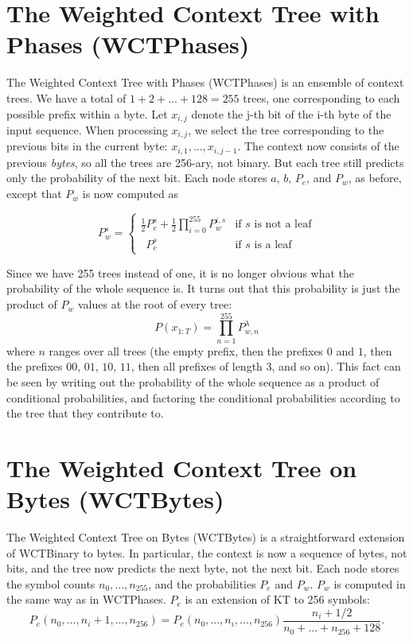 \documentclass[11pt]{scrartcl}
\begin{document}
\section{The Weighted Context Tree with Phases (WCTPhases)}
\label{sec:wct-phases}

The Weighted Context Tree with Phases (WCTPhases) is an ensemble of context
trees. We have a total of $1 + 2 + ... + 128 = 255$ trees, one corresponding to
each possible prefix within a byte. Let $x_{i,j}$ denote the j-th bit of the
i-th byte of the input sequence.  When processing $x_{i,j}$, we select the tree
corresponding to the previous bits in the current byte: $x_{i,1}, ...,
x_{i,j-1}$. The context now consists of the previous {\em bytes}, so all the
trees are 256-ary, not binary. But each tree still predicts only the
probability of the next bit. Each node stores $a$, $b$, $P_e$, and $P_w$, as
before, except that $P_w$ is now computed as

\[
P_w^s =
\left\{
\begin{array}{ll}
\frac{1}{2} P_e^s + \frac{1}{2} \prod_{i=0}^{255}{ P_w^{i,s} }
    & \mbox{if $s$ is not a leaf} \\
\phantom{\frac{1}{2}} P_e^s
    & \mbox{if $s$ is a leaf}
\end{array}
\right.
\]

Since we have 255 trees instead of one, it is no longer obvious what the
probability of the whole sequence is. It turns out that this probability is
just the product of $P_w$ values at the root of every tree:
\[
P(x_{1:T}) = \prod_{n=1}^{255} P_{w, n}^\lambda
\]
where $n$ ranges over all trees (the empty prefix, then the prefixes $0$ and
$1$, then the prefixes $00$, $01$, $10$, $11$, then all prefixes of length 3,
and so on). This fact can be seen by writing out the probability of the whole
sequence as a product of conditional probabilities, and factoring the
conditional probabilities according to the tree that they contribute to.


\section{The Weighted Context Tree on Bytes (WCTBytes)}
\label{sec:wct-bytes}

The Weighted Context Tree on Bytes (WCTBytes) is a straightforward extension of
WCTBinary to bytes. In particular, the context is now a sequence of bytes, not
bits, and the tree now predicts the next byte, not the next bit. Each node
stores the symbol counts $n_0, ..., n_{255}$, and the probabilities $P_e$ and
$P_w$. $P_w$ is computed in the same way as in WCTPhases. $P_e$ is an
extension of KT to 256 symbols:
\[
P_e(n_0, ..., n_i + 1, ..., n_{256}) =
P_e(n_0, ..., n_i, ..., n_{256})
\frac{ n_i + 1/2 }{ n_0 + ... + n_{256} + 128 }.
\]
\end{document}
